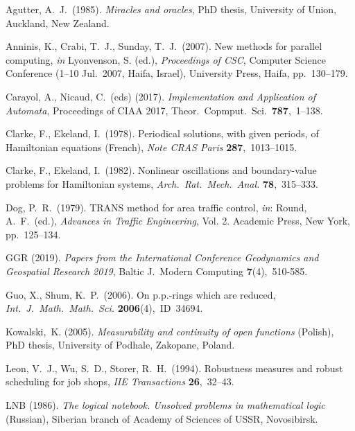 \documentclass{bjmc}   %
\begin{document}
\begin{thebibliography}{}		%

Agutter, A.~J.\ (1985). 
\textit{Miracles and oracles}, 
PhD thesis, University of Union, Auckland, New Zealand.

Anninis, K., Crabi, T.~J., Sunday, T.~J.\ (2007). 
New methods for parallel computing, 
\textit{in} Lyonvenson, S. (ed.), \textit{Proceedings of CSC}, Computer Science Conference (1--10 Jul.\ 2007, Haifa, Israel), University Press, Haifa, pp.~130--179.

Carayol, A., Nicaud, C.\ (eds) (2017).
\textit{Implementation and Application of Automata}, Proceedings of
  CIAA 2017, Theor.\ Copmput.\ Sci.\ \textbf{787},~1--138.

Clarke, F., Ekeland, I.\  (1978).
Periodical solutions, with given periods, of Hamiltonian equations (French),
\textit{Note CRAS Paris} \textbf{287},~1013--1015.

Clarke, F., Ekeland, I.\ (1982).
Nonlinear oscillations and boundary-value problems for Hamiltonian systems, 
\textit{Arch.\ Rat.\ Mech.\ Anal.} \textbf{78},~315--333. 

Dog, P.~R.\ (1979). 
TRANS method for area traffic control, \textit{in}: Round, A.~F.\ (ed.), \textit{Advances in Traffic Engineering}, Vol. 2. Academic Press, New York, pp.~125--134.

GGR  (2019).
\textit{Papers from the International Conference Geodynamics and
  Geospatial Research 2019}, Baltic J.\ Modern Computing \textbf{7}(4),~510-585.

Guo, X., Shum, K.~P.\ (2006).
On p.p.-rings which are reduced, \textit{Int.\ J.\ Math.\ Math.\ Sci.}
\textbf{2006}(4),~ID~34694.

Kowalski,~K. (2005). 
\textit{Measurability and continuity of open functions} (Polish), PhD thesis, University of Podhale, Zakopane, Poland.

Leon, V.~J., Wu, S.~D., Storer, R.~H.\ (1994). 
Robustness measures and robust scheduling for job shops, 
\textit{IIE Transactions} \textbf{26},~32--43.

LNB  (1986).
\textit{The logical notebook. Unsolved problems in mathematical logic} (Russian), 
Siberian branch of Academy of Sciences of USSR, Novosibirsk.


\end{thebibliography}
\end{document}
